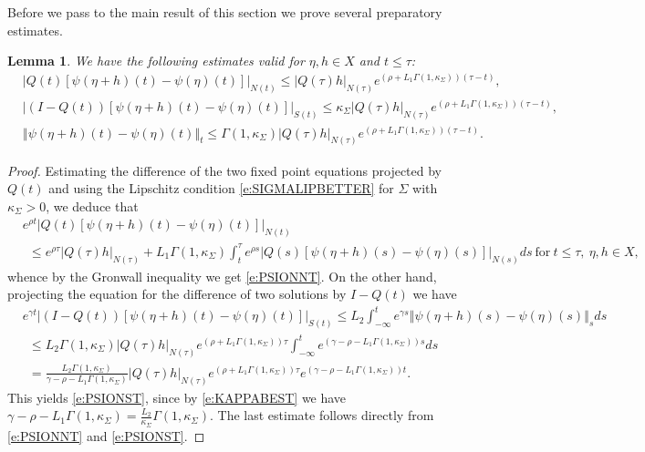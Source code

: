 \documentclass[a4paper,11pt,reqno]{amsart}
\theoremstyle{plain}
\newtheorem{lem}{Lemma}[section]
\theoremstyle{definition}
\numberwithin{equation}{section}
\newcommand{\norm}[1]{\left\Vert#1\right\Vert}
\renewcommand{\leq}{\leqslant}
\begin{document}
Before we pass to the main result of this section we prove several preparatory estimates.
\begin{lem}
We have the following estimates valid for $\eta, h \in X$ and $t\leq \tau$:
\begin{align}\label{e:PSIONNT}
&|Q(t)[\psi(\eta+h)(t)-\psi(\eta)(t)]|_{N(t)}\leq|Q(\tau)h|_{N(\tau)}e^{(\rho+L_1\Gamma(1,\kappa_\Sigma))(\tau-t)},\\
&\label{e:PSIONST}
|(I-Q(t))[\psi(\eta+h)(t)-\psi(\eta)(t)]|_{S(t)}\leq\kappa_\Sigma|Q(\tau)h|_{N(\tau)}e^{(\rho+L_1\Gamma(1,\kappa_\Sigma))(\tau-t)},\\
&\label{e:CONTINUITYPSIT}
\norm{\psi(\eta+h)(t)-\psi(\eta)(t)}_{t}\leq\Gamma\left(1,\kappa_\Sigma\right)|Q(\tau)h|_{N(\tau)}e^{(\rho+L_1\Gamma(1,\kappa_\Sigma))(\tau-t)}.
\end{align}
\end{lem}


\begin{proof}
Estimating the difference of the two fixed point equations projected by $Q(t)$ and using the Lipschitz condition \eqref{e:SIGMALIPBETTER} for $\Sigma$ with $\kappa_\Sigma>0$, we deduce that
\begin{align*}
	& e^{\rho t}|Q(t)[\psi(\eta+h)(t)-\psi(\eta)(t)]|_{N(t)}\\
	& \ \ \leq e^{\rho\tau}|Q(\tau)h|_{N(\tau)}+L_1\Gamma(1,\kappa_\Sigma)\int_{t}^{\tau}e^{\rho s}|Q(s)[\psi(\eta+h)(s)-\psi(\eta)(s)]|_{N(s)}ds
	\ \text{for}\ t\leq\tau,\ \eta, h\in X,
	\end{align*}
whence by the Gronwall inequality we get \eqref{e:PSIONNT}. On the other hand, projecting the equation for the difference of two solutions by $I-Q(t)$ we have
\begin{align*}
	& e^{\gamma t}|(I-Q(t))[\psi(\eta+h)(t)-\psi(\eta)(t)]|_{S(t)}\leq L_2\int_{-\infty}^{t}e^{\gamma s}\norm{\psi(\eta+h)(s)-\psi(\eta)(s)}_{s}ds\\
	& \ \ \leq L_2\Gamma(1,\kappa_\Sigma)|Q(\tau)h|_{N(\tau)}e^{(\rho+L_1\Gamma(1,\kappa_\Sigma))\tau}\int_{-\infty}^{t}e^{(\gamma-\rho-L_1\Gamma(1,\kappa_\Sigma))s}ds\\
& \ \ =\frac{L_2\Gamma(1,\kappa_\Sigma)}{\gamma-\rho-L_1\Gamma(1,\kappa_\Sigma)}|Q(\tau)h|_{N(\tau)}e^{(\rho+L_1\Gamma(1,\kappa_\Sigma))\tau}e^{(\gamma-\rho-L_1\Gamma(1,\kappa_\Sigma))t}.
\end{align*}
This yields \eqref{e:PSIONST}, since by \eqref{e:KAPPABEST} we have
$\gamma-\rho-L_1\Gamma(1,\kappa_\Sigma)=\frac{L_2}{\kappa_\Sigma}\Gamma(1,\kappa_\Sigma).$
The last  estimate follows directly from \eqref{e:PSIONNT} and \eqref{e:PSIONST}.
\end{proof}
\end{document}

